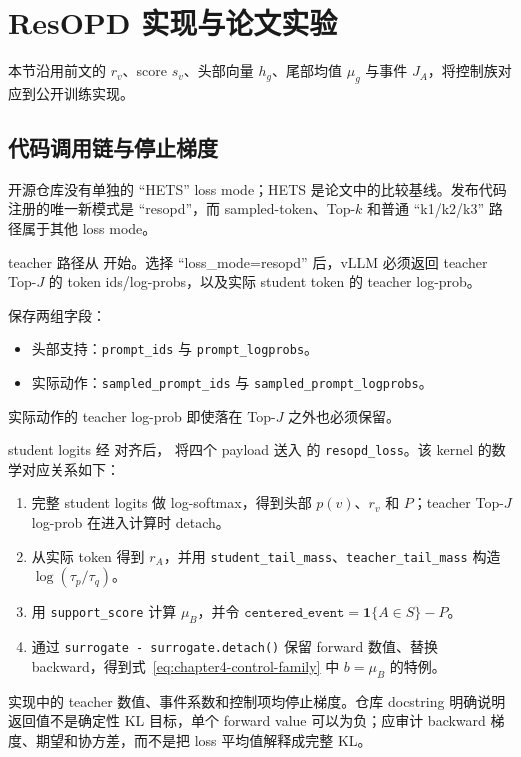 \section{ResOPD 实现与论文实验}
\label{sec:resopd-implementation}

本节沿用前文的 $r_v$、score $s_v$、头部向量 $h_g$、尾部均值 $\mu_g$ 与事件 $J_A$，将控制族对应到公开训练实现。

\subsection{代码调用链与停止梯度}

开源仓库没有单独的 ``HETS'' loss mode；HETS 是论文中的比较基线。发布代码注册的唯一新模式是 ``resopd''，而 sampled-token、Top-$k$ 和普通 ``k1/k2/k3'' 路径属于其他 loss mode。

teacher 路径从  开始。选择 ``loss\_mode=resopd'' 后，vLLM 必须返回 teacher Top-$J$ 的 token ids/log-probs，以及实际 student token 的 teacher log-prob。

 保存两组字段：
\begin{itemize}
\item 头部支持：\texttt{prompt\_ids} 与 \texttt{prompt\_logprobs}。
\item 实际动作：\texttt{sampled\_prompt\_ids} 与 \texttt{sampled\_prompt\_logprobs}。
\end{itemize}
实际动作的 teacher log-prob 即使落在 Top-$J$ 之外也必须保留。

student logits 经  对齐后， 将四个 payload 送入  的 \texttt{resopd\_loss}。该 kernel 的数学对应关系如下：
\begin{enumerate}
\item 完整 student logits 做 log-softmax，得到头部 $p(v)$、$r_v$ 和 $P$；teacher Top-$J$ log-prob 在进入计算时 detach。
\item 从实际 token 得到 $r_A$，并用 \texttt{student\_tail\_mass}、\texttt{teacher\_tail\_mass} 构造 $\log(\tau_p/\tau_q)$。
\item 用 \texttt{support\_score} 计算 $\mu_B$，并令 $\texttt{centered\_event}=\mathbf 1\{A\in S\}-P$。
\item 通过 \texttt{surrogate - surrogate.detach()} 保留 forward 数值、替换 backward，得到式~\eqref{eq:chapter4-control-family} 中 $b=\mu_B$ 的特例。
\end{enumerate}
实现中的 teacher 数值、事件系数和控制项均停止梯度。仓库 docstring 明确说明返回值不是确定性 KL 目标，单个 forward value 可以为负；应审计 backward 梯度、期望和协方差，而不是把 loss 平均值解释成完整 KL。

